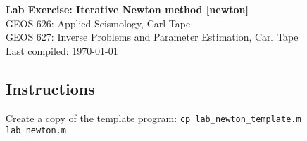 \documentclass[11pt,titlepage,fleqn]{article}
\begin{document}

\begin{spacing}{1.2}
\centering
{\large \bf Lab Exercise: Iterative Newton method [newton]} \\
GEOS 626: Applied Seismology, Carl Tape \\
GEOS 627: Inverse Problems and Parameter Estimation, Carl Tape \\
Last compiled: \today
\end{spacing}


\subsection*{Instructions}

Create a copy of the template program: \verb+cp lab_newton_template.m lab_newton.m+
\end{document}
